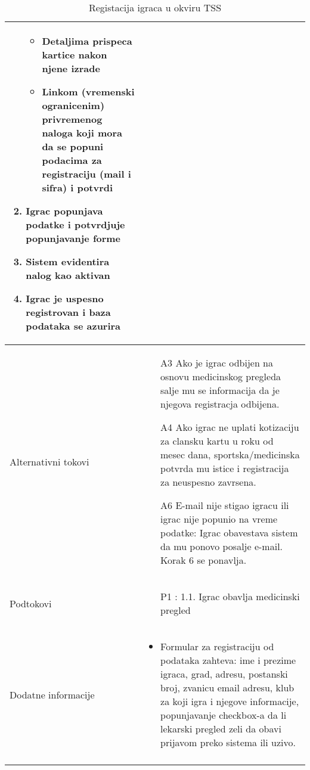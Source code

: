 \documentclass{article}
\begin{document}
\begin{longtable}{| p{} | p{} |}
\begin{enumerate}
\begin{itemize}
            \item Detaljima prispeca kartice nakon njene izrade
            \item Linkom (vremenski ogranicenim) privremenog naloga koji mora da se popuni podacima za registraciju (mail i sifra) i potvrdi
        \end{itemize}
        \item Igrac popunjava podatke i potvrdjuje popunjavanje forme
        \item Sistem evidentira nalog kao aktivan
        \item Igrac je uspesno registrovan i baza podataka se azurira
    \end{enumerate}\\
\hline
    Alternativni tokovi & \begin{itemize}
        \item[A3] Ako je igrac odbijen na osnovu medicinskog pregleda salje mu se informacija da je njegova registracja odbijena.
        \item[A4] Ako igrac ne uplati kotizaciju za clansku kartu u roku od mesec dana, sportska/medicinska potvrda mu istice i registracija za neuspesno zavrsena.
        \item[A6]  E-mail nije stigao igracu ili igrac nije popunio na vreme podatke: Igrac obavestava sistem da mu ponovo posalje e-mail. Korak 6 se ponavlja.
    \end{itemize}\\
\hline
    Podtokovi & \begin{itemize}
        \item[P1]: 1.1. Igrac obavlja medicinski pregled
    \end{itemize}\\

\hline
    Dodatne informacije & \begin{itemize}
        \item Formular za registraciju od podataka zahteva: ime i prezime igraca, grad, adresu, postanski broj, zvanicu email adresu, klub za koji igra i njegove informacije, popunjavanje checkbox-a da li lekarski pregled zeli da obavi prijavom preko sistema ili uzivo.
    \end{itemize} \\
\hline
\caption{Registacija igraca u okviru TSS} %
\end{longtable}


\end{document}
